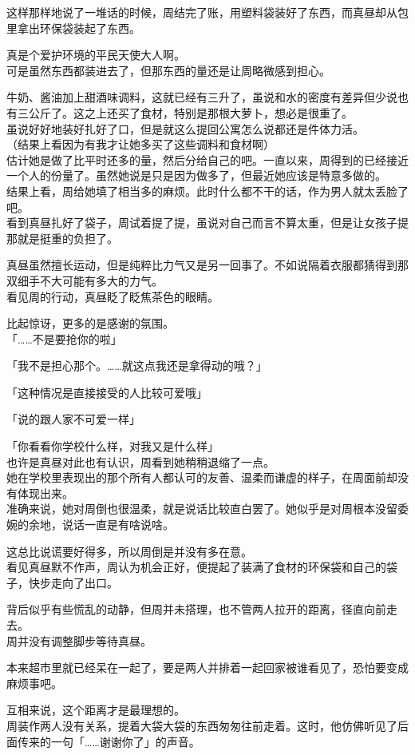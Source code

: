 这样那样地说了一堆话的时候，周结完了账，用塑料袋装好了东西，而真昼却从包里拿出环保袋装起了东西。

真是个爱护环境的平民天使大人啊。\\

可是虽然东西都装进去了，但那东西的量还是让周略微感到担心。

牛奶、酱油加上甜酒味调料，这就已经有三升了，虽说和水的密度有差异但少说也有三公斤了。这之上还买了食材，特别是那根大萝卜，想必是很重了。\\

虽说好好地装好扎好了口，但是就这么提回公寓怎么说都还是件体力活。\\

（结果上看因为有我才让她多买了这些调料和食材啊）\\

估计她是做了比平时还多的量，然后分给自己的吧。一直以来，周得到的已经接近一个人的份量了。虽然她说是只是因为做多了，但最近她应该是特意多做的。\\

结果上看，周给她填了相当多的麻烦。此时什么都不干的话，作为男人就太丢脸了吧。\\

看到真昼扎好了袋子，周试着提了提，虽说对自己而言不算太重，但是让女孩子提那就是挺重的负担了。

真昼虽然擅长运动，但是纯粹比力气又是另一回事了。不如说隔着衣服都猜得到那双细手不大可能有多大的力气。\\

看见周的行动，真昼眨了眨焦茶色的眼睛。

比起惊讶，更多的是感谢的氛围。\\

「……不是要抢你的啦」

「我不是担心那个。……就这点我还是拿得动的哦？」

「这种情况是直接接受的人比较可爱哦」

「说的跟人家不可爱一样」

「你看看你学校什么样，对我又是什么样」\\

也许是真昼对此也有认识，周看到她稍稍退缩了一点。\\

她在学校里表现出的那个所有人都认可的友善、温柔而谦虚的样子，在周面前却没有体现出来。\\

准确来说，她对周倒也很温柔，就是说话比较直白罢了。她似乎是对周根本没留委婉的余地，说话一直是有啥说啥。

这总比说谎要好得多，所以周倒是并没有多在意。\\

看见真昼默不作声，周认为机会正好，便提起了装满了食材的环保袋和自己的袋子，快步走向了出口。

背后似乎有些慌乱的动静，但周并未搭理，也不管两人拉开的距离，径直向前走去。\\

周并没有调整脚步等待真昼。

本来超市里就已经呆在一起了，要是两人并排着一起回家被谁看见了，恐怕要变成麻烦事吧。

互相来说，这个距离才是最理想的。\\

周装作两人没有关系，提着大袋大袋的东西匆匆往前走着。这时，他仿佛听见了后面传来的一句「……谢谢你了」的声音。
